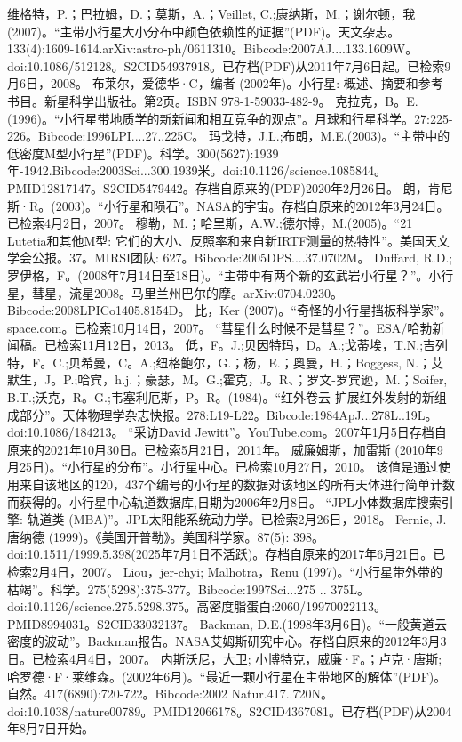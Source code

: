 \begin{enumerate}
 维格特，P.；巴拉姆，D.；莫斯，A.；Veillet, C.;康纳斯，M.；谢尔顿，我(2007)。“主带小行星大小分布中颜色依赖性的证据”(PDF)。天文杂志。133(4):1609-1614.arXiv:astro-ph/0611310。Bibcode:2007AJ....133.1609W。doi:10.1086/512128。S2CID54937918。已存档(PDF)从2011年7月6日起。已检索9月6日，2008。  
 布莱尔，爱德华·C，编者 (2002年)。小行星: 概述、摘要和参考书目。新星科学出版社。第2页。ISBN 978-1-59033-482-9。
 克拉克，B。E.(1996)。“小行星带地质学的新新闻和相互竞争的观点”。月球和行星科学。27:225-226。Bibcode:1996LPI....27..225C。
 玛戈特，J.L.;布朗，M.E.(2003)。“主带中的低密度M型小行星”(PDF)。科学。300(5627):1939年-1942.Bibcode:2003Sci...300.1939米。doi:10.1126/science.1085844。PMID12817147。S2CID5479442。存档自原来的(PDF)2020年2月26日。   
 朗，肯尼斯·R。(2003)。“小行星和陨石”。NASA的宇宙。存档自原来的2012年3月24日。已检索4月2日，2007。
 穆勒，M.；哈里斯，A.W.;德尔博，M.(2005)。“21 Lutetia和其他M型: 它们的大小、反照率和来自新IRTF测量的热特性”。美国天文学会公报。37。MIRSI团队: 627。Bibcode:2005DPS....37.0702M。
 Duffard, R.D.;罗伊格，F。(2008年7月14日至18日)。“主带中有两个新的玄武岩小行星？”。小行星，彗星，流星2008。马里兰州巴尔的摩。arXiv:0704.0230。Bibcode:2008LPICo1405.8154D。
 比，Ker (2007)。“奇怪的小行星挡板科学家”。space.com。已检索10月14日，2007。
 “彗星什么时候不是彗星？”。ESA/哈勃新闻稿。已检索11月12日，2013。
 低，F。J.;贝因特玛，D。A.;戈蒂埃，T.N.;吉列特，F。C.;贝希曼，C。A.;纽格鲍尔，G.；杨，E.；奥曼，H.；Boggess, N.；艾默生，J。P.;哈宾，h.j.；豪瑟，M。G.;霍克，J。R、；罗文-罗宾逊，M.；Soifer, B.T.;沃克，R。G.;韦塞利厄斯，P。R。(1984)。“红外卷云-扩展红外发射的新组成部分”。天体物理学杂志快报。278:L19-L22。Bibcode:1984ApJ...278L..19L。doi:10.1086/184213。
 “采访David Jewitt”。YouTube.com。2007年1月5日存档自原来的2021年10月30日。已检索5月21日，2011年。
 威廉姆斯，加雷斯 (2010年9月25日)。“小行星的分布”。小行星中心。已检索10月27日，2010。
 该值是通过使用来自该地区的120，437个编号的小行星的数据对该地区的所有天体进行简单计数而获得的。小行星中心轨道数据库,日期为2006年2月8日。
 “JPL小体数据库搜索引擎: 轨道类 (MBA)”。JPL太阳能系统动力学。已检索2月26日，2018。
 Fernie, J.唐纳德 (1999)。《美国开普勒》。美国科学家。87(5): 398。doi:10.1511/1999.5.398(2025年7月1日不活跃)。存档自原来的2017年6月21日。已检索2月4日，2007。
 Liou，jer-chyi; Malhotra，Renu (1997)。“小行星带外带的枯竭”。科学。275(5298):375-377。Bibcode:1997Sci...275 .. 375L。doi:10.1126/science.275.5298.375。高密度脂蛋白:2060/19970022113。PMID8994031。S2CID33032137。  
 Backman, D.E.(1998年3月6日)。“一般黄道云密度的波动”。Backman报告。NASA艾姆斯研究中心。存档自原来的2012年3月3日。已检索4月4日，2007。
 内斯沃尼，大卫; 小博特克，威廉·F。；卢克·唐斯; 哈罗德·F·莱维森。(2002年6月)。“最近一颗小行星在主带地区的解体”(PDF)。自然。417(6890):720-722。Bibcode:2002 Natur.417..720N。doi:10.1038/nature00789。PMID12066178。S2CID4367081。已存档(PDF)从2004年8月7日开始。   

\end{enumerate}
